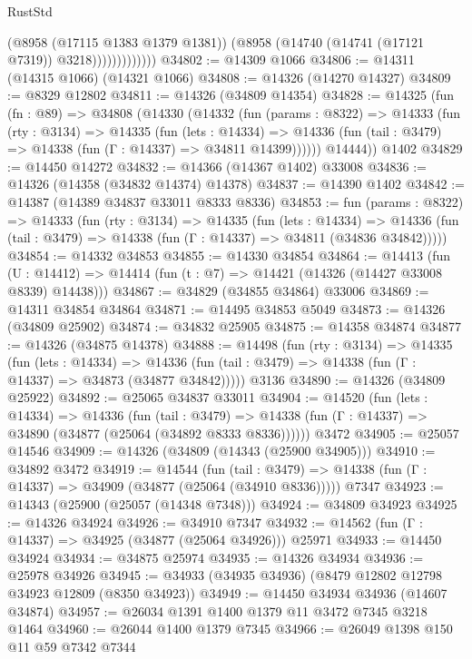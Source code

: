\begin{lexlean}{RustStd}
\begin{coremodule}
                          (@8958 (@17115 @1383 @1379 @1381))
                          (@8958 (@14740 (@14741 (@17121 @7319)) @3218)))))))))))))
@34802 := @14309 @1066
@34806 := @14311 (@14315 @1066) (@14321 @1066)
@34808 := @14326 (@14270 @14327)
@34809 := @8329 @12802
@34811 := @14326 (@34809 @14354)
@34828 := @14325
    (fun (fn : @89) =>
    @34808
      (@14330
        (@14332
          (fun (params : @8322) =>
          @14333
            (fun (rty : @3134) =>
            @14335
              (fun (lets : @14334) =>
              @14336 (fun (tail : @3479) => @14338 (fun (Γ : @14337) => @34811 @14399))))))
        @14444))
    @1402
@34829 := @14450 @14272
@34832 := @14366 (@14367 @1402) @33008
@34836 := @14326 (@14358 (@34832 @14374) @14378)
@34837 := @14390 @1402
@34842 := @14387 (@14389 @34837 @33011 @8333 @8336)
@34853 := fun (params : @8322) =>
  @14333
    (fun (rty : @3134) =>
    @14335
      (fun (lets : @14334) =>
      @14336 (fun (tail : @3479) => @14338 (fun (Γ : @14337) => @34811 (@34836 @34842)))))
@34854 := @14332 @34853
@34855 := @14330 @34854
@34864 := @14413
    (fun (U : @14412) => @14414 (fun (t : @7) => @14421 (@14326 (@14427 @33008 @8339) @14438)))
@34867 := @34829 (@34855 @34864) @33006
@34869 := @14311 @34854 @34864
@34871 := @14495 @34853 @5049
@34873 := @14326 (@34809 @25902)
@34874 := @34832 @25905
@34875 := @14358 @34874
@34877 := @14326 (@34875 @14378)
@34888 := @14498
    (fun (rty : @3134) =>
    @14335
      (fun (lets : @14334) =>
      @14336 (fun (tail : @3479) => @14338 (fun (Γ : @14337) => @34873 (@34877 @34842)))))
    @3136
@34890 := @14326 (@34809 @25922)
@34892 := @25065 @34837 @33011
@34904 := @14520
    (fun (lets : @14334) =>
    @14336
      (fun (tail : @3479) =>
      @14338 (fun (Γ : @14337) => @34890 (@34877 (@25064 (@34892 @8333 @8336))))))
    @3472
@34905 := @25057 @14546
@34909 := @14326 (@34809 (@14343 (@25900 @34905)))
@34910 := @34892 @3472
@34919 := @14544
    (fun (tail : @3479) => @14338 (fun (Γ : @14337) => @34909 (@34877 (@25064 (@34910 @8336)))))
    @7347
@34923 := @14343 (@25900 (@25057 (@14348 @7348)))
@34924 := @34809 @34923
@34925 := @14326 @34924
@34926 := @34910 @7347
@34932 := @14562 (fun (Γ : @14337) => @34925 (@34877 (@25064 @34926))) @25971
@34933 := @14450 @34924
@34934 := @34875 @25974
@34935 := @14326 @34934
@34936 := @25978 @34926
@34945 := @34933 (@34935 @34936) (@8479 @12802 @12798 @34923 @12809 (@8350 @34923))
@34949 := @14450 @34934 @34936 (@14607 @34874)
@34957 := @26034 @1391 @1400 @1379 @11 @3472 @7345 @3218 @1464
@34960 := @26044 @1400 @1379 @7345
@34966 := @26049 @1398 @150 @11 @59 @7342 @7344

\end{coremodule}
\end{lexlean}
